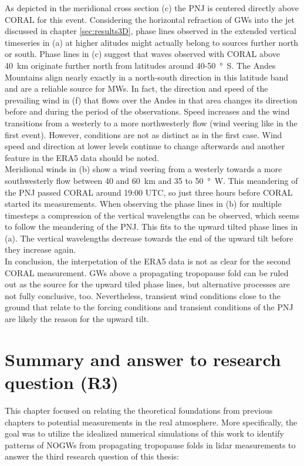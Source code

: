 As depicted in the meridional cross section (c) the PNJ is centered directly above CORAL for this event. Considering the horizontal refraction of GWs into the jet discussed in chapter \ref{sec:results3D}, phase lines observed in the extended vertical timeseries in (a) at higher alitudes might actually belong to sources further north or south. Phase lines in (c) suggest that waves observed with CORAL above \SI{40}{\kilo\meter} originate further north from latitudes around 40-\SI{50}{\degree S}. The Andes Mountains align nearly exactly in a north-south direction in this latitude band and are a reliable source for MWs. In fact, the direction and speed of the prevailing wind in (f) that flows over the Andes in that area changes its direction before and during the period of the observations. Speed increases and the wind transitions from a westerly to a more northwesterly flow (wind veering like in the first event). However, conditions are not as distinct as in the first case. Wind speed and direction at lower levels continue to change afterwards and another feature in the ERA5 data should be noted. \\
Meridional winds in (b) show a wind veering from a westerly towards a more southwesterly flow between 40 and \SI{60}{\kilo\meter} and 35 to \SI{50}{\degree W}. This meandering of the PNJ passed CORAL around 19:00 UTC, so just three hours before CORAL started its measurements. When observing the phase lines in (b) for multiple timesteps a compression of the vertical wavelengths can be observed, which seems to follow the meandering of the PNJ. This fits to the upward tilted phase lines in (a). The vertical wavelengths decrease towards the end of the upward tilt before they increase again. \\
In conclusion, the interpetation of the ERA5 data is not as clear for the second CORAL measurement. GWs above a propagating tropopause fold can be ruled out as the source for the upward tiled phase lines, but alternative processes are not fully conclusive, too. Nevertheless, transient wind conditions close to the ground that relate to the forcing conditions and transient conditions of the PNJ are likely the reason for the upward tilt.

\section{Summary and answer to research question (R3)}
\label{sec:lidOb-summary}
This chapter focused on relating the theoretical foundations from previous chapters to potential measurements in the real atmosphere. More specifically, the goal was to utilize the idealized numerical simulations of this work to identify patterns of NOGWs from propagating tropopause folds in lidar measurements to answer the third research question of this thesis:

